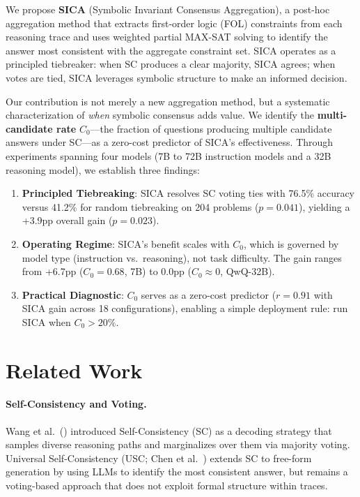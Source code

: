 \documentclass[11pt,a4paper]{article}
\begin{document}
We propose \textbf{SICA} (Symbolic Invariant Consensus Aggregation), a post-hoc aggregation method that extracts first-order logic (FOL) constraints from each reasoning trace and uses weighted partial MAX-SAT solving to identify the answer most consistent with the aggregate constraint set. SICA operates as a principled tiebreaker: when SC produces a clear majority, SICA agrees; when votes are tied, SICA leverages symbolic structure to make an informed decision.

Our contribution is not merely a new aggregation method, but a systematic characterization of \emph{when} symbolic consensus adds value. We identify the \textbf{multi-candidate rate} $C_0$---the fraction of questions producing multiple candidate answers under SC---as a zero-cost predictor of SICA's effectiveness. Through experiments spanning four models (7B to 72B instruction models and a 32B reasoning model), we establish three findings:

\begin{enumerate}
\item \textbf{Principled Tiebreaking}: SICA resolves SC voting ties with 76.5\% accuracy versus 41.2\% for random tiebreaking on 204 problems ($p=0.041$), yielding a +3.9pp overall gain ($p=0.023$).
\item \textbf{Operating Regime}: SICA's benefit scales with $C_0$, which is governed by model type (instruction vs.\ reasoning), not task difficulty. The gain ranges from +6.7pp ($C_0=0.68$, 7B) to 0.0pp ($C_0 \approx 0$, QwQ-32B).
\item \textbf{Practical Diagnostic}: $C_0$ serves as a zero-cost predictor ($r=0.91$ with SICA gain across 18 configurations), enabling a simple deployment rule: run SICA when $C_0 > 20\%$.
\end{enumerate}

\section{Related Work}

\paragraph{Self-Consistency and Voting.}
Wang et al.\ (\citeyear{wang2023selfconsistency}) introduced Self-Consistency (SC) as a decoding strategy that samples diverse reasoning paths and marginalizes over them via majority voting. Universal Self-Consistency (USC; Chen et al.\ \citeyear{chen2023universal}) extends SC to free-form generation by using LLMs to identify the most consistent answer, but remains a voting-based approach that does not exploit formal structure within traces.
\end{document}
